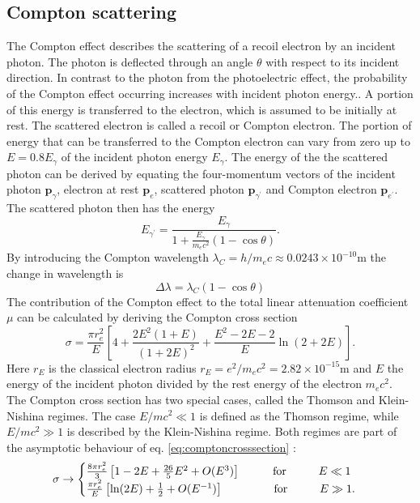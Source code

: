 \subsection{Compton scattering}
The Compton effect describes the scattering of a recoil electron by an incident photon. The photon is deflected through an angle $\theta$ with respect to its incident direction. In contrast to the photon from the photoelectric effect, the probability of the Compton effect occurring increases with incident photon energy.. A portion of this energy is transferred to the electron, which is assumed to be initially at rest. The scattered electron is called a recoil or Compton electron. The portion of energy that can be transferred to the Compton electron can vary from zero up to $E=0.8 E_\gamma$ of the incident photon energy $E_\gamma$. The energy of the the scattered photon can be derived by equating the four-momentum vectors of the incident photon $\mathbf{p}_\gamma$, electron at rest $\mathbf{p}_e$, scattered photon $\mathbf{p}_{\gamma^\prime}$ and Compton electron $\mathbf{p}_{e^\prime}$. The scattered photon then has the energy
\begin{equation}
E_{\gamma^\prime} = \frac{E_\gamma}{1+\frac{E_\gamma}{m_ec^2}(1-\cos\theta)}.
\end{equation}
By introducing the Compton wavelength $\lambda_C = h/m_ec \approx 0.0243\times 10^{-10}$m the change in wavelength is
\begin{equation}
\Delta \lambda = \lambda_C(1-\cos\theta)
\end{equation}
The contribution of the Compton effect to the total linear attenuation coefficient $\mu$ can be calculated by deriving the Compton cross section \cite{Jauch}
\begin{equation}\label{eq:comptoncrosssection}
\sigma = \frac{\pi r_e^2}{E} \left[4+\frac{2E^2(1+E)}{(1+2E)^2}+\frac{E^2-2E-2}{E}\ln(2+2E)\right].
\end{equation}
Here $r_E$ is the classical electron radius $r_E = e^2/m_ec^2 = 2.82\times 10^{-15}$m and $E$ the energy of the incident photon divided by the rest energy of the electron $m_ec^2$. The Compton cross section has two special cases, called the Thomson and Klein-Nishina regimes. The case $E/mc^2 \ll 1$ is defined as the Thomson regime, while $E/mc^2 \gg 1$ is described by the Klein-Nishina regime. Both regimes are part of the asymptotic behaviour of eq. \ref{eq:comptoncrosssection} \cite{Heitler}:
\begin{equation}
\sigma \rightarrow\begin{cases}
\frac{8\pi r_e^2}{3}\left[1-2E+\frac{26}{5}E^2+O(E^3)\right]\hspace{1cm}\mathrm{for}\hspace{1cm}E\ll 1\\
\frac{\pi r_e^2}{E}\left[\ln(2E)+\frac{1}{2}+O(E^{-1})\right]\hspace{1.57cm}\mathrm{for}\hspace{1cm}E\gg 1.
\end{cases}
\end{equation}
